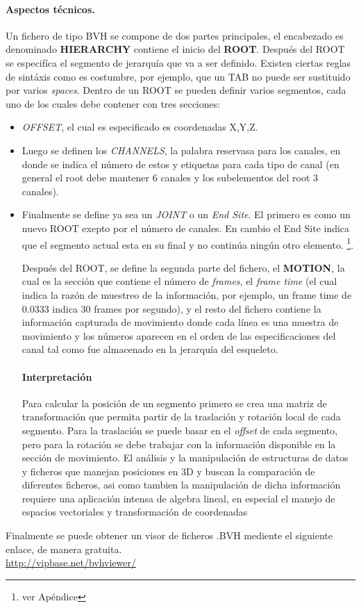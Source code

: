 \documentclass[11pt,letterpaper]{article}     %
\begin{document}
\paragraph{Aspectos t\' ecnicos.}
Un fichero de tipo BVH se compone de dos partes principales, el encabezado es denominado \textbf{HIERARCHY} contiene el inicio del \textbf{ROOT}. Despu\' es del ROOT se especif\' ica el segmento de jerarqu\' ia que va a ser definido. Existen ciertas reglas de sint\' axis como es costumbre, por ejemplo, que un TAB no puede ser sustituido por varios \textit{spaces}. 
Dentro de un ROOT se pueden definir varios segmentos, cada uno de los cuales debe contener con tres secciones:
\begin{itemize}
\item \textit{OFFSET}, el cual es especificado es coordenadas X,Y,Z. 
\item Luego se definen los \textit{CHANNELS}, la palabra reservasa para los canales, en donde se indica el n\' umero de estos y etiquetas para cada tipo de canal (en general el root debe mantener 6 canales y los subelementos del root 3 canales).
\item Finalmente se define ya sea un \textit{JOINT} o un \textit{End Site}. El primero es como un nuevo ROOT exepto por el n\' umero de canales. En cambio el End Site indica que el segmento actual esta en su final y no contin\' ua ning\' un otro elemento. \footnote{ver Ap\' endice  }.

Despu\' es del ROOT, se define la segunda parte del fichero, el \textbf{MOTION}, la cual es la secci\' on que contiene el n\' umero de \textit{frames}, el \textit{frame time} (el cual indica la raz\' on de muestreo de la informaci\' on, por ejemplo, un frame time de 0.0333 indica 30 frames por segundo), y el resto del fichero contiene la informaci\' on capturada de movimiento donde cada l\' inea es una muestra de movimiento y los n\' umeros aparecen en el orden de las especificaciones del canal tal como fue almacenado en la jerarqu\' ia del esqueleto.

\paragraph{Interpretaci\' on}
Para calcular la posici\' on de un segmento primero se crea una matriz de transformaci\' on que permita partir de la traslaci\' on y rotaci\' on local de cada segmento. 
Para la traslaci\' on se puede basar en el 
\textit{offset} de cada segmento, pero para la rotaci\' on se debe trabajar con la informaci\' on disponible en la secci\' on de movimiento.
El an\' alisis y la manipulaci\' on de estructuras de datos y ficheros que manejan posiciones en 3D y buscan la comparaci\' on de diferentes ficheros, asi como tambien la manipulaci\' on de dicha informaci\' on requiere una aplicaci\' on intensa de algebra lineal, en especial el manejo de espacios vectoriales y transformaci\' on de coordenadas \cite{BioVision}
\end{itemize}
Finalmente se puede obtener un visor de ficheros .BVH mediente el siguiente enlace, de manera gratuita.\\ \href{url}{http://vipbase.net/bvhviewer/}
\end{document}
